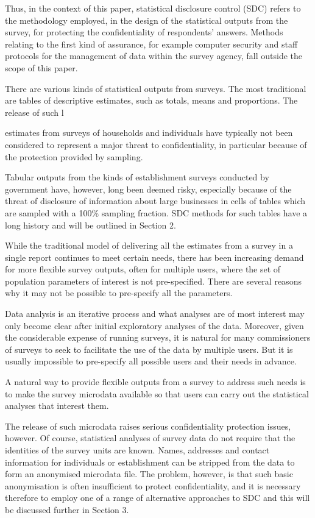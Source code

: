 Thus, in the context of this paper, statistical disclosure control (SDC) refers to the
methodology employed, in the design of the statistical outputs from the survey, for
protecting the confidentiality of respondents’ answers. Methods relating to the first kind
of assurance, for example computer security and staff protocols for the management of
data within the survey agency, fall outside the scope of this paper.



There are various kinds of statistical outputs from surveys. The most traditional are
tables of descriptive estimates, such as totals, means and proportions. The release of such
l



estimates from surveys of households and individuals have typically not been considered
to represent a major threat to confidentiality, in particular because of the protection
provided by sampling. 


Tabular outputs from the kinds of establishment surveys
conducted by government have, however, long been deemed risky, especially because of
the threat of disclosure of information about large businesses in cells of tables which are
sampled with a 100\% sampling fraction. SDC methods for such tables have a long history
and will be outlined in Section 2.

While the traditional model of delivering all the estimates from a survey in a single
report continues to meet certain needs, there has been increasing demand for more
ﬂexible survey outputs, often for multiple users, where the set of population parameters
of interest is not pre-specified. There are several reasons why it may not be possible to
pre-specify all the parameters. 

Data analysis is an iterative process and what analyses are
of most interest may only become clear after initial exploratory analyses of the data.
Moreover, given the considerable expense of running surveys, it is natural for many
commissioners of surveys to seek to facilitate the use of the data by multiple users. But it
is usually impossible to pre-specify all possible users and their needs in advance. 

A
natural way to provide ﬂexible outputs from a survey to address such needs is to make
the survey microdata available so that users can carry out the statistical analyses that
interest them.

The release of such microdata raises serious confidentiality protection issues,
however. Of course, statistical analyses of survey data do not require that the identities of
the survey units are known. Names, addresses and contact information for individuals or
establishment can be stripped from the data to form an anonymised microdata file. The
problem, however, is that such basic anonymisation is often insufficient to protect
confidentiality, and it is necessary therefore to employ one of a range of alternative
approaches to SDC and this will be discussed further in Section 3.

